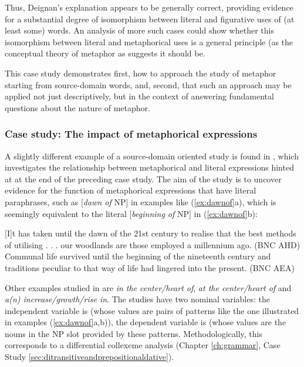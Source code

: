 Thus, Deignan's explanation appears to be generally correct, providing evidence for a substantial degree of isomorphism between literal and figurative uses of (at least some) words. An analysis of more such cases could show whether this isomorphism between literal and metaphorical uses is a general principle (as the conceptual theory of metaphor as \citep{lakoff_contemporary_1993} suggests it should be.

This case study demonstrates first, how to approach the study of metaphor starting from source-domain words, and, second, that such an approach may be applied not just descriptively, but in the context of answering fundamental questions about the nature of metaphor.

\subsubsection{Case study: The impact of metaphorical expressions}
\label{sec:theimpactofmetaphoricalexpressions}

A slightly different example of a source-domain oriented study is found in \citet{stefanowitsch_function_2005}, which investigates the relationship between metaphorical and literal expressions hinted at at the end of the preceding case study. The aim of the study is to uncover evidence for the function of metaphorical expressions that have literal paraphrases, such as [\textit{dawn of} NP] in examples like (\ref{ex:dawnof}a), which is seemingly equivalent to the literal [\textit{beginning of} NP] in (\ref{ex:dawnof}b):

\begin{exe}
\ex
\begin{xlist} 
\label{ex:dawnof}
\ex $[$I$]$t has taken until the dawn of the 21st century to realise that the best methods of utilising . . . our woodlands are those employed a millennium ago. (BNC AHD)
\ex Communal life survived until the beginning of the nineteenth century and traditions peculiar to that way of life had lingered into the present. (BNC AEA)
\end{xlist}
\end{exe}

Other examples studied in \citet{stefanowitsch_function_2005} are \textit{in the center/heart of}, \textit{at the center/heart of} and \textit{a(n) increase/growth/rise in}. The studies have two nominal variables: the independent variable is  (whose values are pairs of patterns like the one illustrated in examples (\ref{ex:dawnof}a,b)), the dependent variable is  (whose values are the nouns in the NP slot provided by these patterns. Methodologically, this corresponds to a differential collexeme analysis (Chapter \ref{ch:grammar}, Case Study \ref{sec:ditransitiveandprepositionaldative}).

